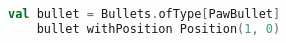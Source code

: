 \begin{lstlisting}[language=Scala, label=code:bullet-update, caption=aggiornamento di un bullet. ]
    val bullet = Bullets.ofType[PawBullet]
    bullet withPosition Position(1, 0)
\end{lstlisting}